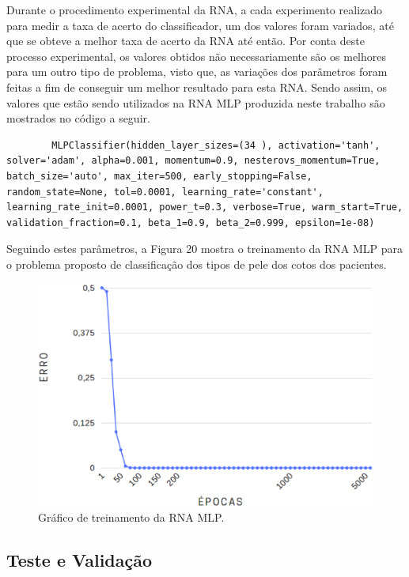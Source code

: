 	Durante o procedimento experimental da RNA, a cada experimento realizado para medir a taxa de acerto do classificador, um dos valores foram variados, até que se obteve a melhor taxa de acerto da RNA até então. Por conta deste processo experimental, os valores obtidos não necessariamente são os melhores para um outro tipo de problema, visto que, as variações dos parâmetros foram feitas a fim de conseguir um melhor resultado para esta RNA. Sendo assim, os valores que estão sendo utilizados na RNA MLP produzida neste trabalho são mostrados no código a seguir.

	\begin{lstlisting}
		MLPClassifier(hidden_layer_sizes=(34 ), activation='tanh', solver='adam', alpha=0.001, momentum=0.9, nesterovs_momentum=True, batch_size='auto', max_iter=500, early_stopping=False, random_state=None, tol=0.0001, learning_rate='constant', learning_rate_init=0.0001, power_t=0.3, verbose=True, warm_start=True, validation_fraction=0.1, beta_1=0.9, beta_2=0.999, epsilon=1e-08)
	\end{lstlisting} 

	Seguindo estes parâmetros, a Figura 20 mostra o treinamento da RNA MLP para o problema proposto de classificação dos tipos de pele dos cotos dos pacientes.

	\begin{figure}[ht]
	    \centering
	    \label{fig20}
	        \includegraphics[keepaspectratio=true, scale=0.5]{editaveis/images/grafico_rna.eps}
	    \caption{Gráfico de treinamento da RNA MLP.}
	\end{figure} 


	\subsection{Teste e Validação}

